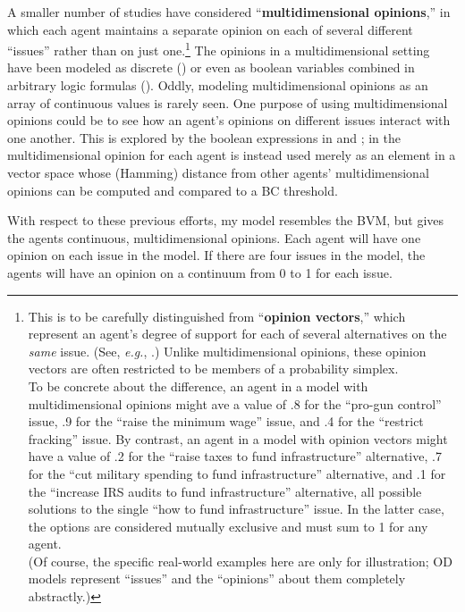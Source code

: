 A smaller number of studies have considered ``\textbf{multidimensional
opinions},'' in which each agent maintains a separate opinion on each of
several different ``issues'' rather than on just one.\footnote{This is to be
carefully distinguished from ``\textbf{opinion vectors},'' which represent an
agent's degree of support for each of several alternatives on the \textit{same}
issue. (See, \textit{e.g.}, \cite{sirbu_opinion_2013}.) Unlike multidimensional
opinions, these opinion vectors are often restricted to be members of a
probability simplex.\\\indent To be concrete about the difference, an agent in
a model with multidimensional opinions might ave a value of .8 for the
``pro-gun control'' issue, .9 for the ``raise the minimum wage'' issue, and .4
for the ``restrict fracking'' issue. By contrast, an agent in a model with
opinion vectors might have a value of .2 for the ``raise taxes to fund
infrastructure'' alternative, .7 for the ``cut military spending to fund
infrastructure'' alternative, and .1 for the ``increase IRS audits to fund
infrastructure'' alternative, all possible solutions to the single ``how to
fund infrastructure'' issue. In the latter case, the options are considered
mutually exclusive and must sum to 1 for any agent.\\\indent (Of course, the
specific real-world examples here are only for illustration; OD models
represent ``issues'' and the ``opinions'' about them completely abstractly.)}
The opinions in a multidimensional setting have been modeled as discrete
(\cite{deffuant_mixing_2000}) or even as boolean variables combined in
arbitrary logic formulas (\cite{van_den_herik_modelling_2019,
cholvy_diffusion_2016}). Oddly, modeling multidimensional opinions as an array
of continuous values is rarely seen. One purpose of using multidimensional
opinions could be to see how an agent's opinions on different issues interact
with one another. This is explored by the boolean expressions in
\cite{van_den_herik_modelling_2019} and \cite{cholvy_diffusion_2016}; in
\cite{deffuant_mixing_2000} the multidimensional opinion for each agent is
instead used merely as an element in a vector space whose (Hamming) distance
from other agents' multidimensional opinions can be computed and compared to a
BC threshold. 

With respect to these previous efforts, my model resembles the BVM, but gives
the agents continuous, multidimensional opinions. Each agent will have one opinion on each issue in the model. If there are four issues in the model, the agents will have an opinion on a continuum from 0 to 1 for each issue. 

